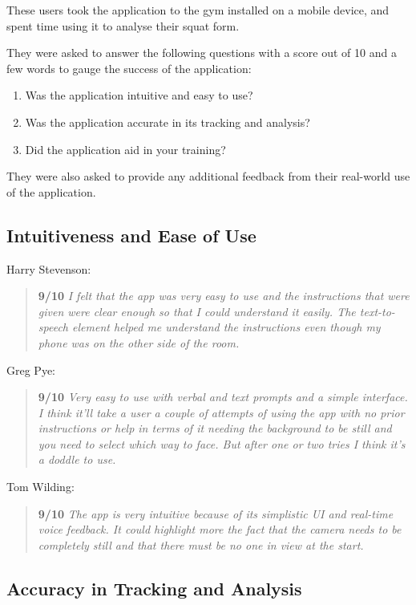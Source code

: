 These users took the application to the gym installed on a mobile device, and spent time using it to analyse their squat form.

They were asked to answer the following questions with a score out of 10 and a few words to gauge the success of the application:

\begin{enumerate}
    \item Was the application intuitive and easy to use?
    \item Was the application accurate in its tracking and analysis?
    \item Did the application aid in your training?
\end{enumerate}

They were also asked to provide any additional feedback from their real-world use of the application.

\pagebreak
\subsection{Intuitiveness and Ease of Use}

Harry Stevenson:
\begin{quote}
\textbf{9/10} \emph{I felt that the app was very easy to use and the instructions that were given were clear enough so that I could understand it easily. The text-to-speech element helped me understand the instructions even though my phone was on the other side of the room.}
\end{quote}

Greg Pye:
\begin{quote}
\textbf{9/10} \emph{Very easy to use with verbal and text prompts and a simple interface. I think it'll take a user a couple of attempts of using the app with no prior instructions or help in terms of it needing the background to be still and you need to select which way to face. But after one or two tries I think it's a doddle to use.}
\end{quote}

Tom Wilding:
\begin{quote}
\textbf{9/10} \emph{The app is very intuitive because of its simplistic UI and real-time voice feedback. It could highlight more the fact that the camera needs to be completely still and that there must be no one in view at the start.}
\end{quote}

\subsection{Accuracy in Tracking and Analysis}


